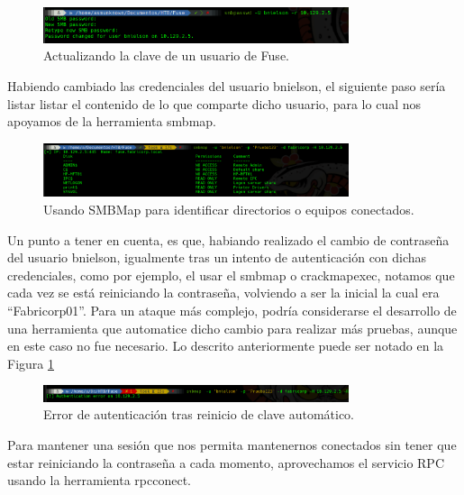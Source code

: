 \documentclass{article}
\begin{document}
\begin{figure}[h]
	\center
	\includegraphics[width=0.8\textwidth]{images/fuse/image9.png}
	\caption{Actualizando la clave de un usuario de Fuse.}
\end{figure}

\vfill
Habiendo cambiado las credenciales del usuario bnielson, el siguiente paso sería listar listar el contenido de lo que comparte dicho usuario, para lo cual nos apoyamos de la herramienta smbmap. 

\begin{figure}[h]
	\center
	\includegraphics[width=0.8\textwidth]{images/fuse/image10.png}
	\caption{Usando SMBMap para identificar directorios o equipos conectados.}
\end{figure}

\vfill
Un punto a tener en cuenta, es que, habiando realizado el cambio de contraseña del usuario bnielson, igualmente tras un intento de autenticación con dichas credenciales, como por ejemplo, el usar el smbmap o crackmapexec, notamos que cada vez se está reiniciando la contraseña, volviendo a ser la inicial la cual era “Fabricorp01”. Para un ataque más complejo, podría considerarse el desarrollo de una herramienta que automatice dicho cambio para realizar más pruebas, aunque en este caso no fue necesario. Lo descrito anteriormente puede ser notado en la Figura \ref{fail_fuse}


\clearpage


\begin{figure}
	\center
	\includegraphics[width=0.8\textwidth]{images/fuse/image11.png}
	\caption{Error de autenticación tras reinicio de clave automático.}
	\label{fail_fuse}
\end{figure}


Para mantener una sesión que nos permita mantenernos conectados sin tener que estar reiniciando la contraseña a cada momento, aprovechamos el servicio RPC usando la herramienta rpcconect.
\end{document}
